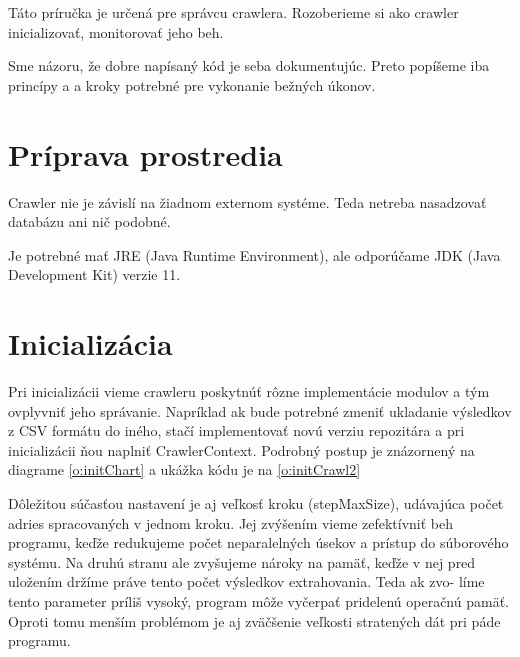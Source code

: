 


Táto príručka je určená pre správcu crawlera. Rozoberieme si ako crawler inicializovať, monitorovať jeho beh. 

Sme názoru, že dobre napísaný kód je seba dokumentujúc. Preto popíšeme iba princípy a a kroky potrebné pre vykonanie bežných úkonov. 

\section{Príprava prostredia}
Crawler nie je závislí na žiadnom externom systéme. Teda netreba nasadzovať databázu ani nič podobné. 

Je potrebné mať JRE (Java Runtime Environment), ale odporúčame JDK (Java Development Kit) verzie 11. 

\section{Inicializácia}
Pri inicializácii vieme crawleru poskytnúť rôzne implementácie modulov a tým ovplyvniť jeho správanie. Napríklad ak bude potrebné zmeniť ukladanie výsledkov z CSV formátu do iného, stačí implementovať novú verziu repozitára a pri inicializácii ňou naplniť CrawlerContext. Podrobný postup je znázornený na diagrame \ref{o:initChart} a ukážka kódu je na  \ref{o:initCrawl2}

Dôležitou súčasťou nastavení je aj veľkosť kroku (stepMaxSize), udávajúca počet adries spracovaných v jednom kroku. Jej zvýšením vieme zefektívniť beh programu, keďže redukujeme počet neparalelných úsekov a prístup do súborového systému. Na druhú stranu ale zvyšujeme nároky na pamäť, keďže v nej pred uložením držíme práve tento počet výsledkov extrahovania. Teda ak zvo-
líme tento parameter príliš vysoký, program môže vyčerpať pridelenú operačnú pamäť. Oproti tomu menším problémom je aj zväčšenie veľkosti stratených dát pri páde programu.

